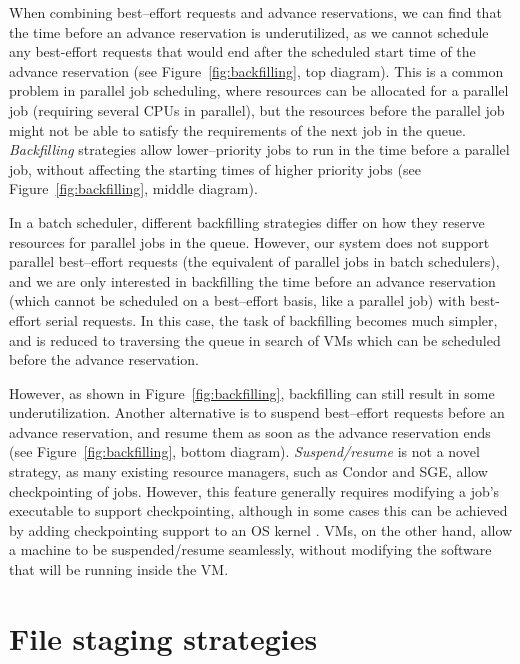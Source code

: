 When combining best--effort requests and advance reservations, we can find that the time before an advance reservation is underutilized, as we cannot schedule any best-effort requests that would end after the scheduled start time of the advance reservation (see Figure~\ref{fig:backfilling}, top diagram). This is a common problem in parallel job scheduling, where resources can be allocated for a parallel job (requiring several CPUs in parallel), but the resources before the parallel job might not be able to satisfy the requirements of the next job in the queue. \emph{Backfilling} strategies \cite{10.1109/ICPPW.2002.1039773,feitelson02analyzing,feitelson04parallel} allow lower--priority jobs to run in the time before a parallel job, without affecting the starting times of higher priority jobs (see Figure~\ref{fig:backfilling}, middle diagram).

In a batch scheduler, different backfilling strategies differ on how they reserve resources for parallel jobs in the queue. However, our system does not support parallel best--effort requests (the equivalent of parallel jobs in batch schedulers), and we are only interested in backfilling the time before an advance reservation (which cannot be scheduled on a best--effort basis, like a parallel job) with best-effort serial requests. In this case, the task of backfilling becomes much simpler, and is reduced to traversing the queue in search of VMs which can be scheduled before the advance reservation.

However, as shown in Figure~\ref{fig:backfilling}, backfilling can still result in some underutilization. Another alternative is to suspend best--effort requests before an advance reservation, and resume them as soon as the advance reservation ends (see Figure~\ref{fig:backfilling}, bottom diagram). \emph{Suspend/resume} is not a novel strategy, as many existing resource managers, such as Condor and SGE, allow checkpointing of jobs. However, this feature generally requires modifying a job's executable to support checkpointing, although in some cases this can be achieved by adding checkpointing support to an OS kernel \cite{blcr}. VMs, on the other hand, allow a machine to be suspended/resume seamlessly, without modifying the software that will be running inside the VM.


\section{File staging strategies}
\label{sec:filestaging}

